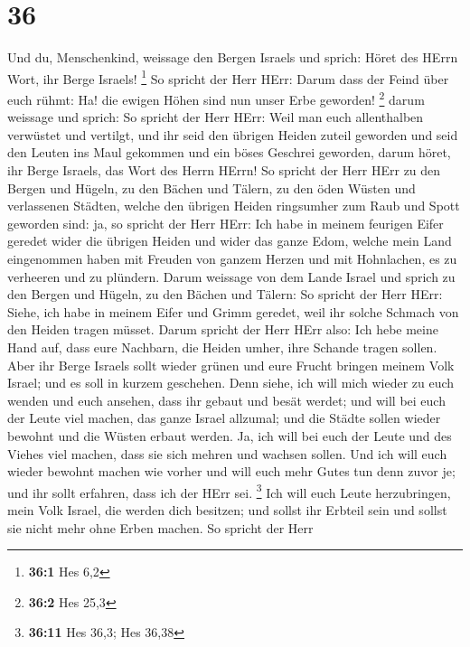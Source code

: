 \hypertarget{section-10}{%
\section{36}\label{section-10}}

 Und du, Menschenkind, weissage den Bergen Israels und
sprich: Höret des HErrn Wort, ihr Berge Israels! \footnote{\textbf{36:1}
  Hes 6,2}  So spricht der Herr HErr: Darum dass der Feind
über euch rühmt: Ha! die ewigen Höhen sind nun unser Erbe geworden!
\footnote{\textbf{36:2} Hes 25,3}  darum weissage und
sprich: So spricht der Herr HErr: Weil man euch allenthalben verwüstet
und vertilgt, und ihr seid den übrigen Heiden zuteil geworden und seid
den Leuten ins Maul gekommen und ein böses Geschrei geworden,
 darum höret, ihr Berge Israels, das Wort des Herrn HErrn!
So spricht der Herr HErr zu den Bergen und Hügeln, zu den Bächen und
Tälern, zu den öden Wüsten und verlassenen Städten, welche den übrigen
Heiden ringsumher zum Raub und Spott geworden sind:  ja, so
spricht der Herr HErr: Ich habe in meinem feurigen Eifer geredet wider
die übrigen Heiden und wider das ganze Edom, welche mein Land
eingenommen haben mit Freuden von ganzem Herzen und mit Hohnlachen, es
zu verheeren und zu plündern.  Darum weissage von dem Lande
Israel und sprich zu den Bergen und Hügeln, zu den Bächen und Tälern: So
spricht der Herr HErr: Siehe, ich habe in meinem Eifer und Grimm
geredet, weil ihr solche Schmach von den Heiden tragen müsset.
 Darum spricht der Herr HErr also: Ich hebe meine Hand auf,
dass eure Nachbarn, die Heiden umher, ihre Schande tragen sollen.
 Aber ihr Berge Israels sollt wieder grünen und eure Frucht
bringen meinem Volk Israel; und es soll in kurzem geschehen.
 Denn siehe, ich will mich wieder zu euch wenden und euch
ansehen, dass ihr gebaut und besät werdet;  und will bei
euch der Leute viel machen, das ganze Israel allzumal; und die Städte
sollen wieder bewohnt und die Wüsten erbaut werden.  Ja,
ich will bei euch der Leute und des Viehes viel machen, dass sie sich
mehren und wachsen sollen. Und ich will euch wieder bewohnt machen wie
vorher und will euch mehr Gutes tun denn zuvor je; und ihr sollt
erfahren, dass ich der HErr sei. \footnote{\textbf{36:11} Hes 36,3; Hes
  36,38}  Ich will euch Leute herzubringen, mein Volk
Israel, die werden dich besitzen; und sollst ihr Erbteil sein und sollst
sie nicht mehr ohne Erben machen.  So spricht der Herr
